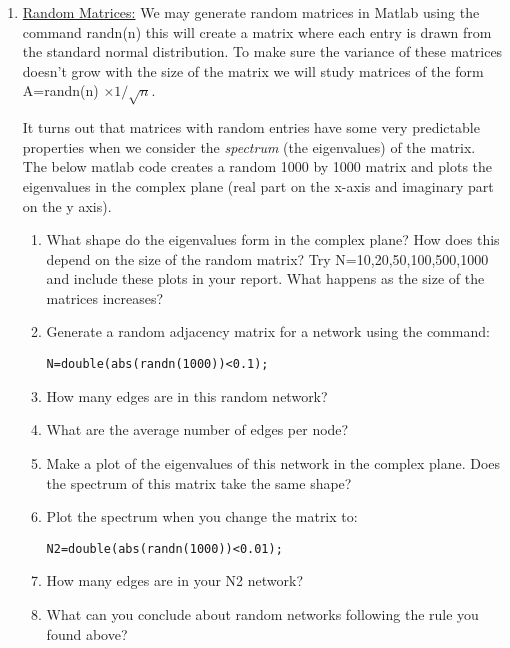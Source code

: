 \documentclass[11pt, a4paper]{article}
\begin{document}
\begin{enumerate}
\item \underline{Random Matrices:} We may generate random matrices in Matlab using the command randn(n) this will create a matrix where each entry is drawn from the standard normal distribution. To make sure the variance of these matrices doesn't grow with the size of the matrix we will study matrices of the form A=randn(n) $\times 1/\sqrt{n}$. 

It turns out that matrices with random entries have some very predictable properties when we consider the \textit{spectrum} (the eigenvalues) of the matrix. The below matlab code creates a random 1000 by 1000 matrix and plots the eigenvalues in the complex plane (real part on the x-axis and imaginary part on the y axis). 



\begin{enumerate}
\item What shape do the eigenvalues form in the complex plane? How does this depend on the size of the random matrix? Try N=10,20,50,100,500,1000 and include these plots in your report.  What happens as the size of the matrices increases?
\item Generate a random adjacency matrix for a network using the command:
\begin{lstlisting}
N=double(abs(randn(1000))<0.1);
\end{lstlisting}
\item How many edges are in this random network? 
\item What are the average number of edges per node?
\item Make a plot of the eigenvalues of this network in the complex plane. Does the spectrum of this matrix take the same shape?
\item Plot the spectrum when you change the matrix to:
\begin{lstlisting}
N2=double(abs(randn(1000))<0.01);
\end{lstlisting}
\item How many edges are in your N2 network? 
\item What can you conclude about random networks following the rule you found above?
\end{enumerate}





\end{enumerate}


\end{document}
